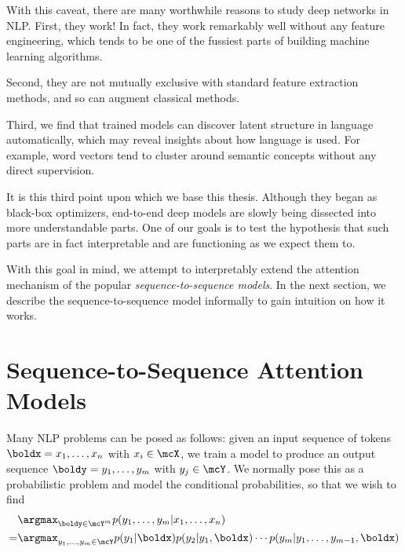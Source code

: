\documentclass[12pt]{report}
\begin{document}
With this caveat, there are many worthwhile reasons to study deep networks in NLP. First, they work! In fact, they work remarkably well without any feature engineering, which tends to be one of the fussiest parts of building machine learning algorithms.

Second, they are not mutually exclusive with standard feature extraction methods, and so can augment classical methods.

Third, we find that trained models can discover latent structure in language automatically, which may reveal insights about how language is used. For example, word vectors tend to cluster around semantic concepts without any direct supervision.


It is this third point upon which we base this thesis. Although they began as black-box optimizers, end-to-end deep models are slowly being dissected into more understandable parts. One of our goals is to test the hypothesis that such parts are in fact interpretable and are functioning as we expect them to.

With this goal in mind, we attempt to interpretably extend the attention mechanism of the popular \emph{sequence-to-sequence models}. In the next section, we describe the sequence-to-sequence model informally to gain intuition on how it works.





\section{Sequence-to-Sequence Attention Models}

Many NLP problems can be posed as follows: given an input sequence of tokens $\boldx = x_1, \ldots, x_n$ with $x_i \in \mcX$, we train a model to produce an output sequence $\boldy = y_1, \ldots, y_m$ with $y_j \in \mcY$. We normally pose this as a probabilistic problem and model the conditional probabilities, so that we wish to find
\begin{equation}
\begin{split}
&\argmax_{\boldy \in \mcY^m} p(y_1, \ldots, y_m | x_1, \ldots, x_n) \\
= & \argmax_{y_1, \ldots, y_m \in \mcY} p(y_1 | \boldx)p(y_2 | y_1, \boldx) \cdots p(y_m | y_1, \ldots, y_{m-1}, \boldx)
\end{split}
\end{equation}
\end{document}
